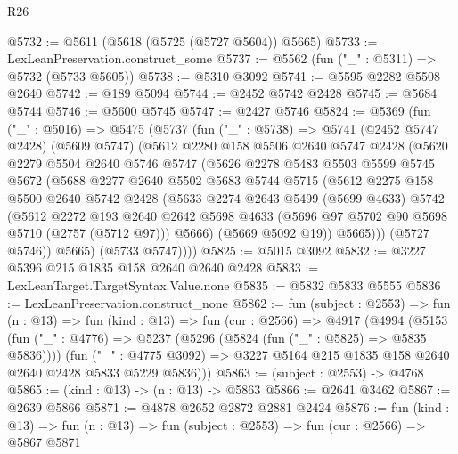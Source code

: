 \begin{lexlean}{R26}
\begin{coremodule}
@5732 := @5611 (@5618 (@5725 (@5727 @5604)) @5665)
@5733 := LexLeanPreservation.construct_some
@5737 := @5562 (fun ("_" : @5311) => @5732 (@5733 @5605))
@5738 := @5310 @3092
@5741 := @5595 @2282 @5508 @2640
@5742 := @189 @5094
@5744 := @2452 @5742 @2428
@5745 := @5684 @5744
@5746 := @5600 @5745
@5747 := @2427 @5746
@5824 := @5369
    (fun ("_" : @5016) =>
    @5475
      (@5737
        (fun ("_" : @5738) =>
        @5741
          (@2452 @5747 @2428)
          (@5609 @5747)
          (@5612
            @2280
            @158
            @5506
            @2640
            @5747
            @2428
            (@5620
              @2279
              @5504
              @2640
              @5746
              @5747
              (@5626
                @2278
                @5483
                @5503
                @5599
                @5745
                @5672
                (@5688
                  @2277
                  @2640
                  @5502
                  @5683
                  @5744
                  @5715
                  (@5612
                    @2275
                    @158
                    @5500
                    @2640
                    @5742
                    @2428
                    (@5633
                      @2274
                      @2643
                      @5499
                      (@5699 @4633)
                      @5742
                      (@5612
                        @2272
                        @193
                        @2640
                        @2642
                        @5698
                        @4633
                        (@5696 @97 @5702 @90 @5698 @5710 (@2757 (@5712 @97)))
                        @5666)
                      (@5669 @5092 @19))
                    @5665)))
              (@5727 @5746))
            @5665)
          (@5733 @5747))))
@5825 := @5015 @3092
@5832 := @3227 @5396 @215 @1835 @158 @2640 @2640 @2428
@5833 := LexLeanTarget.TargetSyntax.Value.none
@5835 := @5832 @5833 @5555
@5836 := LexLeanPreservation.construct_none
@5862 := fun (subject : @2553) =>
  fun (n : @13) =>
  fun (kind : @13) =>
  fun (cur : @2566) =>
  @4917
    (@4994
      (@5153
        (fun ("_" : @4776) => @5237 (@5296 (@5824 (fun ("_" : @5825) => @5835 @5836))))
        (fun ("_" : @4775 @3092) =>
        @3227 @5164 @215 @1835 @158 @2640 @2640 @2428 @5833 @5229 @5836)))
@5863 := (subject : @2553) -> @4768
@5865 := (kind : @13) -> (n : @13) -> @5863
@5866 := @2641 @3462
@5867 := @2639 @5866
@5871 := @4878 @2652 @2872 @2881 @2424
@5876 := fun (kind : @13) =>
  fun (n : @13) => fun (subject : @2553) => fun (cur : @2566) => @5867 @5871

\end{coremodule}
\end{lexlean}

